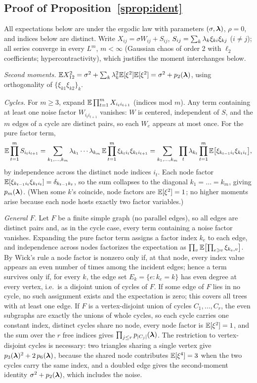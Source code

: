\subsection{Proof of Proposition~\ref{sprop:ident}}

All expectations below are under the ergodic law with
parameters $(\sigma,\bm{\lambda})$, $\rho=0$, and indices below are distinct.
Write $X_{ij}=\sigma W_{ij}+S_{ij}$, $S_{ij}=\sum_k\lambda_k\xi_{ki}\xi_{kj}$
($i\neq j$); all series converge in every $L^m$, $m<\infty$ (Gaussian
chaos of order 2 with $\ell_2$ coefficients; hypercontractivity), which
justifies the moment interchanges below.

\emph{Second moments.} $\mathbb{E} X_{12}^2=\sigma^2+\sum_k\lambda_k^2
\mathbb{E}[\xi^2]\mathbb{E}[\xi^2]=\sigma^2+p_2(\bm{\lambda})$, using orthogonality of
$\{\xi_{k1}\xi_{k2}\}_k$.

\emph{Cycles.} For $m\ge3$, expand
$\mathbb{E}\prod_{t=1}^m X_{i_ti_{t+1}}$ (indices mod $m$). Any term containing at
least one noise factor $W_{i_ti_{t+1}}$ vanishes: $W$ is centered,
independent of $S$, and the $m$ edges of a cycle are distinct pairs, so
each $W_e$ appears at most once. For the pure factor term,
\[
\mathbb{E}\prod_{t=1}^m S_{i_ti_{t+1}}
=\sum_{k_1,\dots,k_m}\lambda_{k_1}\cdots\lambda_{k_m}\,
\mathbb{E}\prod_{t=1}^m \xi_{k_t i_t}\xi_{k_t i_{t+1}}
=\sum_{k_1,\dots,k_m}\prod_t\lambda_{k_t}\prod_{t=1}^m
\mathbb{E}\bigl[\xi_{k_{t-1} i_t}\xi_{k_t i_t}\bigr],
\]
by independence across the distinct node indices $i_t$. Each node factor
$\mathbb{E}[\xi_{k_{t-1}i_t}\xi_{k_ti_t}]=\delta_{k_{t-1}k_t}$, so the sum
collapses to the diagonal $k_1=\dots=k_m$, giving $p_m(\bm{\lambda})$. (When some
$k$'s coincide, node factors are $\mathbb{E}[\xi^2]=1$; no higher moments arise
because each node hosts exactly two factor variables.)

\emph{General $F$.} Let $F$ be a finite simple graph (no parallel
edges), so all edges are distinct pairs and, as in the cycle case, every
term containing a noise factor vanishes. Expanding the pure factor term
assigns a factor index $k_e$ to each edge, and independence across nodes
factorizes the expectation as
$\prod_v\mathbb{E}\bigl[\prod_{e\ni v}\xi_{k_e,v}\bigr]$. By Wick's rule a
node factor is nonzero only if, at that node, every index value appears
an even number of times among the incident edges; hence a term survives
only if, for every $k$, the edge set $E_k=\{e:k_e=k\}$ has even degree
at every vertex, i.e.\ is a disjoint union of cycles of $F$. If some
edge of $F$ lies in no cycle, no such assignment exists and the
expectation is zero; this covers all trees with at least one edge. If
$F$ is a vertex-disjoint union of cycles $C_1,\dots,C_r$, the even
subgraphs are exactly the unions of whole cycles, so each cycle carries
one constant index, distinct cycles share no node, every node factor is
$\mathbb{E}[\xi^2]=1$, and the sum over the $r$ free indices gives
$\prod_{j\le r}p_{|C_j|}(\bm{\lambda})$. The restriction to vertex-disjoint
cycles is necessary: two triangles sharing a single vertex give
$p_3(\bm{\lambda})^2+2\,p_6(\bm{\lambda})$, because the shared node contributes
$\mathbb{E}[\xi^4]=3$ when the two cycles carry the same index, and a doubled
edge gives the second-moment identity $\sigma^2+p_2(\bm{\lambda})$, which
includes the noise.

